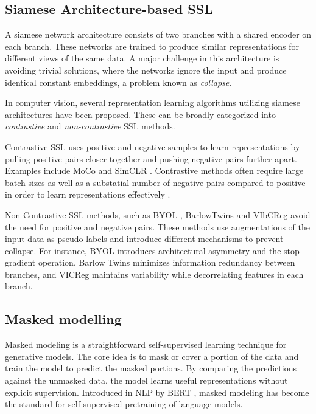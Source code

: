 \documentclass[../../thesis.tex]{subfiles}
\begin{document}
\subsection{Siamese Architecture-based SSL }
A siamese network architecture \cite{siamese} consists of two branches with a shared encoder on each branch. These networks are trained to produce similar representations for different views of the same data. A major challenge in this architecture is avoiding trivial solutions, where the networks ignore the input and produce identical constant embeddings, a problem known as \textit{collapse}.\newline

In computer vision, several representation learning algorithms utilizing siamese architectures have been proposed. These can be broadly categorized into \textit{contrastive} and \textit{non-contrastive} SSL methods.\newline

Contrastive SSL uses positive and negative samples to learn representations by pulling positive pairs closer together and pushing negative pairs further apart. Examples include MoCo \cite{he2020momentum} and SimCLR \cite{chen2020simple}. Contrastive methods often require large batch sizes as well as a substatial number of negative pairs compared to positive in order to learn representations effectively \cite{lee2024computer}.\newline

Non-Contrastive SSL methods, such as BYOL \cite{grill2020bootstrap}, BarlowTwins \cite{zbontar2021barlow} and VIbCReg \cite{lee2024computer} avoid the need for positive and negative pairs. These methods use augmentations of the input data as pseudo labels and introduce different mechanisms to prevent collapse. For instance, BYOL introduces architectural asymmetry and the stop-gradient operation, Barlow Twins minimizes information redundancy between branches, and VICReg maintains variability while decorrelating features in each branch.


\subsection{Masked modelling}
\label{section:Masked modelling}
Masked modeling is a straightforward self-supervised learning technique for generative models. The core idea is to mask or cover a portion of the data and train the model to predict the masked portions. By comparing the predictions against the unmasked data, the model learns useful representations without explicit supervision. Introduced in NLP by BERT \cite{devlin2019bert}, masked modeling has become the standard for self-supervised pretraining of language models.\newline
\end{document}

